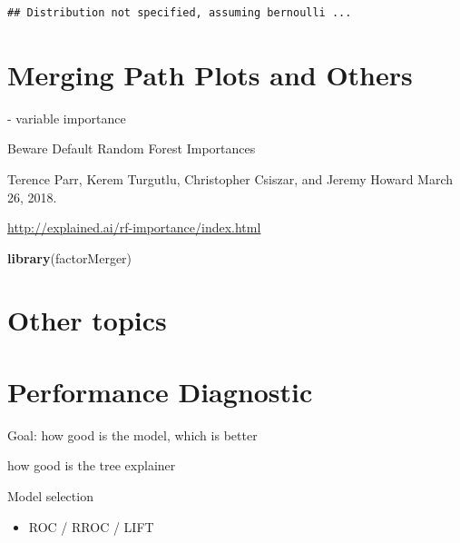 \documentclass[12pt,]{krantz}
\newenvironment{Shaded}{\begin{snugshade}}{\end{snugshade}}
\newcommand{\KeywordTok}[1]{\textcolor[rgb]{0.13,0.29,0.53}{\textbf{#1}}}
\newcommand{\NormalTok}[1]{#1}
\providecommand{\tightlist}{%
  \setlength{\itemsep}{0pt}\setlength{\parskip}{0pt}}
\theoremstyle{definition}
\theoremstyle{definition}
\theoremstyle{definition}
\theoremstyle{remark}
\begin{document}
\begin{verbatim}
## Distribution not specified, assuming bernoulli ...
\end{verbatim}

\hypertarget{factorMerger}{%
\section{Merging Path Plots and Others}\label{factorMerger}}

\citep{demsar2018}

\citep{RJ2017016} \citep{MAGIX}

\citep{R-factorMerger}

\citep{Strobl2007} \citep{Strobl2008} - variable importance

\citep{2018arXiv180101489F}

Beware Default Random Forest Importances

Terence Parr, Kerem Turgutlu, Christopher Csiszar, and Jeremy Howard
March 26, 2018.

\url{http://explained.ai/rf-importance/index.html}

\begin{Shaded}
\begin{Highlighting}[]
\KeywordTok{library}\NormalTok{(factorMerger)}
\end{Highlighting}
\end{Shaded}

\hypertarget{other-topics}{%
\section{Other topics}\label{other-topics}}

\citep{R-randomForestExplainer} \citep{R-ICEbox} \citep{R-ALEPlot}

\citep{R-modelDown}

\hypertarget{modelComparisons}{%
\section{Performance Diagnostic}\label{modelComparisons}}

Goal: how good is the model, which is better

\citep{Piltaver2016} how good is the tree explainer

Model selection

\begin{itemize}
\tightlist
\item
  ROC / RROC / LIFT
\end{itemize}
\end{document}
